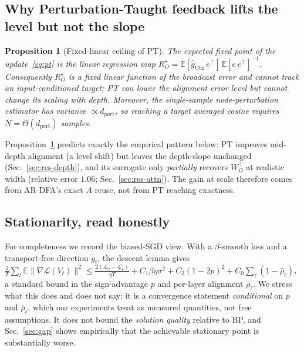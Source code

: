 \documentclass[11pt]{article}
\newtheorem{proposition}{Proposition}
\newcommand{\E}{\mathbb{E}}
\newcommand{\ARDFA}{\textsc{AR-DFA}}
\newcommand{\PT}{\textsc{PT}}
\begin{document}
\subsection{Why Perturbation-Taught feedback lifts the level but not the slope}
\begin{proposition}[Fixed-linear ceiling of \PT]\label{prop:ceiling}
The expected fixed point of the update~\eqref{eq:pt} is the linear regression map $R_O^\star = \E[\hat g_{\mathrm{Ctx}}\,e^\top]\,\E[e\,e^\top]^{-1}$. Consequently $R_O^\star$ is a \emph{fixed} linear function of the broadcast error and cannot track an input-conditioned target; \PT{} can lower the alignment error \emph{level} but cannot change its scaling with depth. Moreover, the single-sample node-perturbation estimator has variance $\propto d_{\mathrm{pert}}$, so reaching a target averaged cosine requires $N=\Theta(d_{\mathrm{pert}})$ samples.
\end{proposition}
Proposition~\ref{prop:ceiling} predicts exactly the empirical pattern below: \PT{} improves mid-depth alignment (a level shift) but leaves the depth-slope unchanged (Sec.~\ref{sec:res-depth}), and its surrogate only \emph{partially} recovers $W_O^\top$ at realistic width (relative error $1.06$; Sec.~\ref{sec:res-attn}). The gain at scale therefore comes from \ARDFA{}'s exact $A$-reuse, not from \PT{} reaching exactness.

\subsection{Stationarity, read honestly}
For completeness we record the biased-SGD view. With a $\beta$-smooth loss and a transport-free direction $\tilde g_t$, the descent lemma gives
$\tfrac1T\sum_t \E\|\nabla\mathcal L(V_t)\|^2 \le \tfrac{2(\mathcal L_0-\mathcal L_\star)}{\eta T} + C_1\beta\eta\sigma^2 + C_2(1-2p)^2 + C_0\sum_\ell(1-\bar\rho_\ell)$,
a standard bound in the sign-advantage $p$ and per-layer alignment $\bar\rho_\ell$. We stress what this does and does not say: it is a convergence statement \emph{conditional} on $p$ and $\bar\rho_\ell$, which our experiments treat as measured quantities, not free assumptions. It does not bound the \emph{solution quality} relative to BP, and Sec.~\ref{sec:gap} shows empirically that the achievable stationary point is substantially worse.
\end{document}
